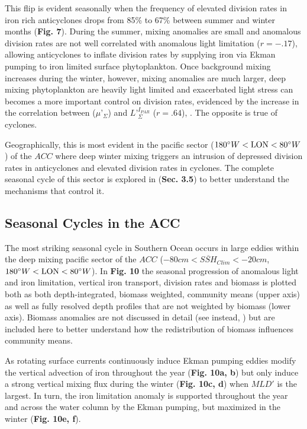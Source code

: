 \documentclass{article}
\begin{document}
This flip is evident seasonally when the frequency of elevated division rates in iron rich anticyclones drops from 85\% to 67\% between summer and winter months (\textbf{Fig. 7}). During the summer, mixing anomalies are small and anomalous division rates are not well correlated with anomalous light limitation ($r=-.17$), allowing anticyclones to inflate division rates by supplying iron via Ekman pumping to iron limited surface phytoplankton. Once background mixing increases during the winter, however, mixing anomalies are much larger, deep mixing phytoplankton are heavily light limited and exacerbated light stress can becomes a more important control on division rates, evidenced by the increase in the correlation between ($\mu’ _\Sigma$) and $L’_\Sigma^{I_{PAR}}$ ($r=.64$), . The opposite is true of cyclones.

Geographically, this is most evident in the pacific sector ($180\degree W<\textrm{LON}< 80\degree W$) of the $ACC$ where deep winter mixing triggers an intrusion of depressed division rates in anticyclones and elevated division rates in cyclones. The complete seasonal cycle of this sector is explored in (\textbf{Sec. 3.5}) to better understand the mechanisms that control it.  




\subsection{Seasonal Cycles in the ACC}

The most striking seasonal cycle in Southern Ocean occurs in large eddies within the deep mixing pacific sector of the $ACC$ ($-80cm<\overline{SSH}_{Clim}<-20cm$, $180\degree W<\textrm{LON}< 80\degree W$). In \textbf{Fig. 10} the seasonal progression of anomalous light and iron limitation, vertical iron transport, division rates and biomass is plotted both as both depth-integrated, biomass weighted, community means (upper axis) as well as fully resolved depth profiles that are not weighted by biomass (lower axis). Biomass anomalies are not discussed in detail (see instead, \parencite{RohrEddyInducedVariabilityinprep.}) but are included here to better understand how the redistribution of biomass influences community means.  

As rotating surface currents continuously induce Ekman pumping eddies modify the vertical advection of iron throughout the year (\textbf{Fig. 10a, b}) but only induce a strong vertical mixing flux during the winter (\textbf{Fig. 10c, d}) when $MLD'$ is the largest.  In turn, the iron limitation anomaly is supported throughout the year and across the water column by the Ekman pumping, but maximized in the winter (\textbf{Fig. 10e, f}).  
\end{document}
